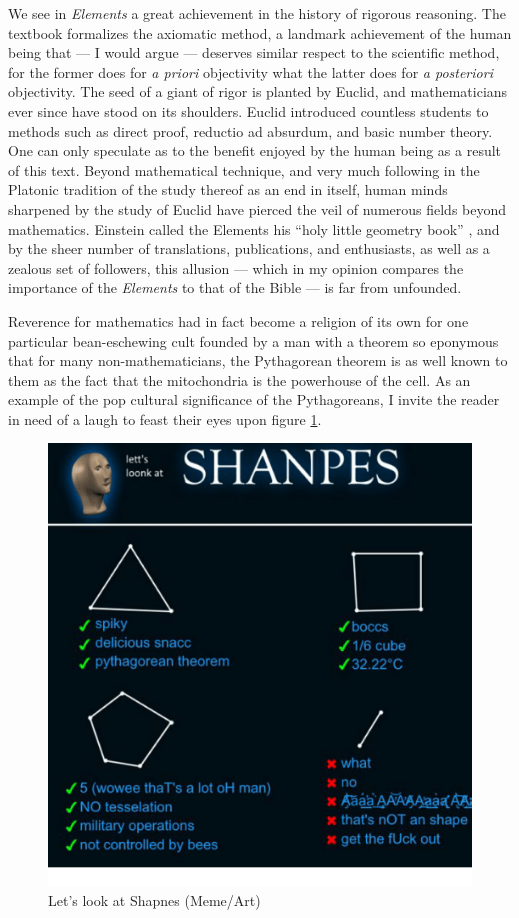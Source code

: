 \documentclass[12pt]{article}
\begin{document}
We see in \textit{Elements} a great achievement
in the history of rigorous reasoning.
The textbook formalizes the axiomatic method,
a landmark achievement of the human being that
--- I would argue ---
deserves similar respect to the scientific method,
for the former does for \textit{a priori} objectivity
what the latter does for \textit{a posteriori} objectivity.
The seed of a giant of rigor is planted by Euclid,
and mathematicians ever since have stood on its shoulders.
Euclid introduced countless students to methods such as
direct proof, reductio ad absurdum, and basic number theory.
One can only speculate as to the benefit enjoyed by
the human being as a result of this text.
Beyond mathematical technique,
and very much following in the Platonic tradition
of the study thereof as an end in itself,
human minds sharpened by the study of Euclid
have pierced the veil of numerous fields
beyond mathematics.
Einstein called the Elements
his ``holy little geometry book'' \cite{einstein},
and by the sheer number of
translations, publications, and enthusiasts,
as well as a zealous set of followers,
this allusion
--- which in my opinion compares the importance of the \textit{Elements}
to that of the Bible ---
is far from unfounded.

Reverence for mathematics had in fact
become a religion of its own
for one particular bean-eschewing
cult founded by a man with a theorem
so eponymous that for many non-mathematicians,
the Pythagorean theorem is as well known to them
as the fact that the mitochondria is the powerhouse of the cell.
As an example of the pop cultural significance of the Pythagoreans,
I invite the reader in need of a laugh to feast their eyes upon figure \ref{fig2}.


\begin{figure}
	\includegraphics[scale=0.4]{shanpes.png}
	\centering
	\caption{Let's look at Shapnes (Meme/Art) \cite{shanpes}}
	\label{fig2}
\end{figure}
\end{document}

